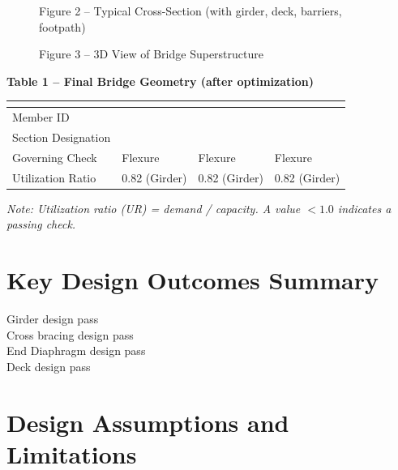 \documentclass[12pt,a4paper]{report}
\numberwithin{table}{chapter}
\numberwithin{figure}{chapter}
\begin{document}
\newpage

\begin{figure}[H]
\centering
{}
\caption*{Figure 2 -- Typical Cross-Section (with girder, deck, barriers, footpath)}
\end{figure}

\begin{figure}[H]
\centering
{}
\caption*{Figure 3 -- 3D View of Bridge Superstructure}
\end{figure}

\noindent\textbf{Table 1 -- Final Bridge Geometry (after optimization)}

\vspace{0.4em}
\noindent
\begin{tabular}{|C{2.8cm}|C{4.1cm}|C{4.1cm}|C{4.1cm}|}
\hline
  \textbf{} &
  \textbf{} &
  \textbf{} &
  \textbf{} \\
\hline
Member ID &  &  &  \\
\hline
Section Designation &  &  &  \\
\hline
Governing Check & Flexure & Flexure & Flexure \\
\hline
Utilization Ratio & 0.82 (Girder) & 0.82 (Girder) & 0.82 (Girder) \\
\hline
\end{tabular}

\vspace{0.4em}
\noindent\textit{Note: Utilization ratio (UR) = demand / capacity. A value $< 1.0$ indicates a passing check.}

\vspace{1em}

\section*{Key Design Outcomes Summary}
\label{sec:key-outcomes}

\noindent Girder design pass \\
Cross bracing design pass \\
End Diaphragm design pass \\
Deck design pass

\section*{Design Assumptions and Limitations}
\label{sec:assumptions}
\end{document}
